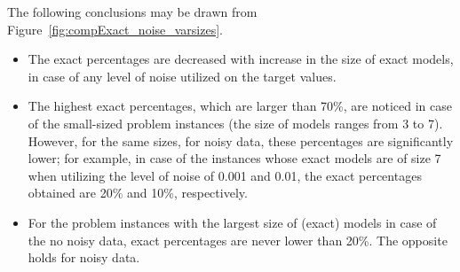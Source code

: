 \documentclass{bmcart}
\begin{document}
The  following conclusions may be drawn from Figure~\ref{fig:compExact_noise_varsizes}.
\begin{itemize}
	\item The exact percentages are decreased with increase in  the size of exact models, in case of any level of noise utilized on the target values.  %
	\item The highest exact percentages, which are larger than 70\%, are noticed in case of the small-sized problem instances  (the size of models ranges from 3 to 7). However, for the same sizes, for noisy data, these percentages are significantly lower; for example, in case of the instances whose exact models are of size 7 when utilizing the level of noise of 0.001 and 0.01, the exact percentages obtained are 20\% and 10\%, respectively. 
	
	\item   For the problem instances with the largest size of (exact) models in case of the no noisy data, exact percentages are never lower than 20\%. The opposite holds for noisy data. 
\end{itemize}
\end{document}
